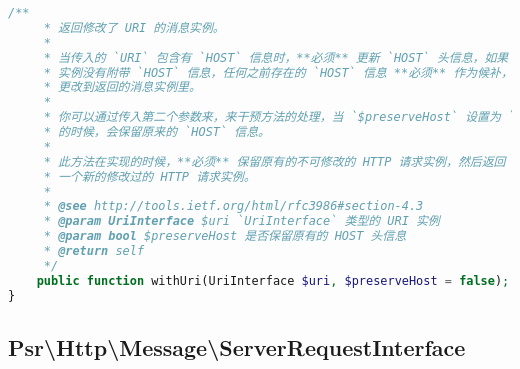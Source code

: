 \begin{lstlisting}[language=PHP]
    /**
     * 返回修改了 URI 的消息实例。
     *
     * 当传入的 `URI` 包含有 `HOST` 信息时，**必须** 更新 `HOST` 头信息，如果 `URI` 
     * 实例没有附带 `HOST` 信息，任何之前存在的 `HOST` 信息 **必须** 作为候补，应用
     * 更改到返回的消息实例里。
     * 
     * 你可以通过传入第二个参数来，来干预方法的处理，当 `$preserveHost` 设置为 `true` 
     * 的时候，会保留原来的 `HOST` 信息。
     * 
     * 此方法在实现的时候，**必须** 保留原有的不可修改的 HTTP 请求实例，然后返回
     * 一个新的修改过的 HTTP 请求实例。
     *
     * @see http://tools.ietf.org/html/rfc3986#section-4.3
     * @param UriInterface $uri `UriInterface` 类型的 URI 实例
     * @param bool $preserveHost 是否保留原有的 HOST 头信息
     * @return self
     */
    public function withUri(UriInterface $uri, $preserveHost = false);
}
\end{lstlisting}

\subsection{Psr\textbackslash Http\textbackslash Message\textbackslash ServerRequestInterface}




